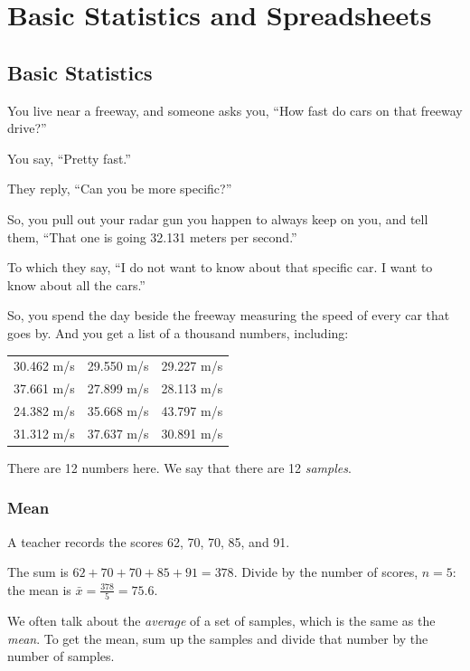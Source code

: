\chapter{Basic Statistics and Spreadsheets}


\section{Basic Statistics}
You live near a freeway, and someone asks you, ``How fast do cars on that freeway drive?''

You say, ``Pretty fast.''

They reply, ``Can you be more specific?''

So, you pull out your radar gun you happen to always keep on you, and tell them, ``That one is going 32.131 meters per second.''

To which they say, ``I do not want to know about that specific car. I want to know about all the cars.''

So, you spend the day beside the freeway measuring the speed of every
car that goes by. And you get a list of a thousand numbers, including:

\begin{tabular}{c | c | c}
30.462 m/s  & 29.550 m/s & 29.227 m/s \\
37.661 m/s  & 27.899 m/s & 28.113 m/s \\
24.382 m/s & 35.668 m/s & 43.797 m/s \\
31.312 m/s & 37.637 m/s & 30.891 m/s
\end {tabular}

There are 12 numbers here. We say that there are 12 \textit{samples}.

\subsection{Mean}

\begin{Worked}
\begin{Problem}
A teacher records the scores 62, 70, 70, 85, and 91.
\end{Problem}
\begin{Solution}
The sum is $62 + 70 + 70 + 85 + 91 = 378$. Divide by the number of scores, $n = 5$: the mean is $\bar{x} = \frac{378}{5} = 75.6$.
\end{Solution}
\end{Worked}


We often talk about the \textit{average} of a set of samples, which is the 
same as the \textit{mean}. To get the mean, sum up the
samples and divide that number by the number of samples.


